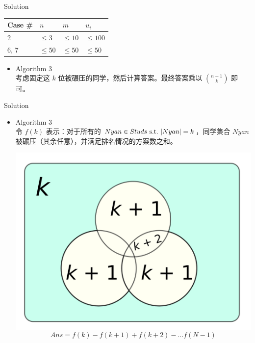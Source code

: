 \documentclass[UTF8]{beamer}
\begin{document}
\begin{frame}{Solution}

\begin{tabularx}{\textwidth}{X|X|X|X} \hline
Case \# & $n$ & $m$ & $u_i$ \\ \hline \hline
2    & $\leq 3$   & $\leq 10$  & $\leq 100$  \\ \hline
6, 7 & $\leq 50$  & $\leq 50$  & $\leq 50$   \\ \hline
\end{tabularx}
\begin{itemize}
    \item Algorithm 3 \\
        考虑固定这 $k$ 位被碾压的同学，然后计算答案。最终答案乘以 $\binom{n - 1}{k}$ 即可。
\end{itemize}

\end{frame}

\begin{frame}{Solution}

\begin{itemize}
    \item Algorithm 3 \\
        令 $f(k)$ 表示：对于所有的 $Nyan \in Studs\ {\rm s.t.}\ |Nyan| = k$，同学集合 $Nyan$
        被碾压（其余任意），并满足排名情况的方案数之和。

        \pause
        \includegraphics[scale=0.66]{mark-inexcl.png}
        $$
            Ans = f(k) - f(k + 1) + f(k + 2) - \dots f(N - 1)
        $$
\end{itemize}

\end{frame}
\end{document}
